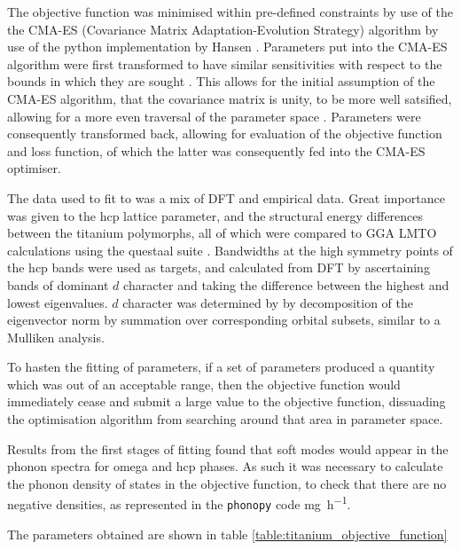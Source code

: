 \documentclass[11pt]{article}
\begin{document}
The objective function was minimised within pre-defined constraints by use of the the CMA-ES
(Covariance Matrix Adaptation-Evolution Strategy) algorithm by use
of the python implementation by Hansen
\cite{hansen2019pycma}. Parameters put into the CMA-ES
algorithm were first transformed to have similar sensitivities
with respect to the bounds in which they are sought \cite{Hansen2016}. This
allows for the initial assumption of the CMA-ES algorithm, that the
covariance matrix is unity, to be more well satsified, allowing
for a more even traversal of the parameter space
\cite{Jastrebski2006}. Parameters were consequently transformed back,
allowing for evaluation of the objective function and
loss function, of which the latter was consequently fed into the CMA-ES optimiser.


The data used to fit to was a mix of DFT and empirical data. Great
importance was given to the hcp lattice parameter, and the
structural energy differences between the titanium polymorphs, all
of which were compared to GGA LMTO calculations using the questaal
suite \cite{Pashov2020}. Bandwidths at the high symmetry points of
the hcp bands were used as targets, and calculated from DFT by
ascertaining bands of dominant \(d\) character and taking the
difference between the highest and lowest eigenvalues. \(d\)
character was determined by by decomposition of the eigenvector
norm by summation over corresponding orbital subsets, similar to a
Mulliken analysis.

To hasten the fitting of parameters, if a set of parameters
produced a quantity which was out of an acceptable range, then the
objective function would immediately cease and submit a large value
to the objective function, dissuading the optimisation algorithm
from searching around that area in parameter space.

Results from the first stages of fitting found that
soft modes would appear in the phonon spectra for omega and hcp
phases. As such it was necessary to calculate the phonon density of
states in the objective function, to check that there are no
negative densities, as represented in the \texttt{phonopy} code
\cite{Togo2015}  \unit{\milli\gram\per\hour}.

The parameters obtained are shown in table \ref{table:titanium_objective_function}
\end{document}
